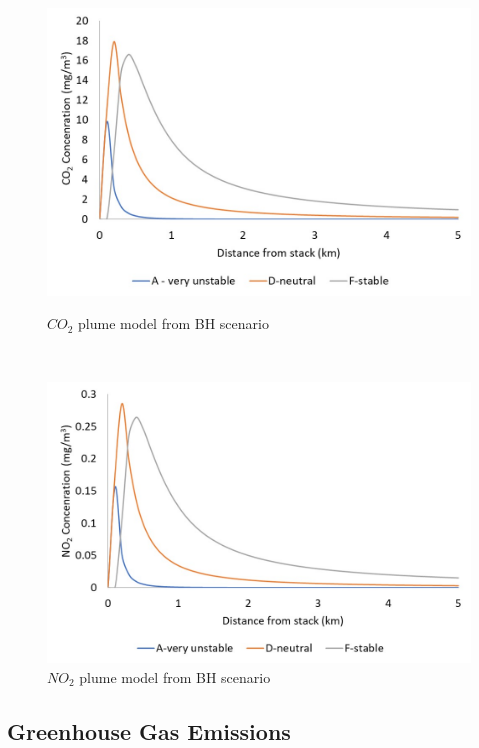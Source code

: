 \begin{figure}[t!]
    \centering
    \begin{minipage}[t]{0.5\textwidth}
        \centering
        \includegraphics[width=\linewidth]{figures/CO2plumeBH.jpg}
        \caption{$CO_2$ plume model from BH scenario}
        \label{fig:CO2plumeBH}
    \end{minipage}%
    ~ 
    \begin{minipage}[t]{0.5\textwidth}
        \centering
        \includegraphics[width=\linewidth]{figures/NO2plumeBH.jpg}
        \caption{$NO_2$ plume model from BH scenario}
         \label{fig:NO2plumeBH}
    \end{minipage}
    
\end{figure}


\subsection{Greenhouse Gas Emissions}

